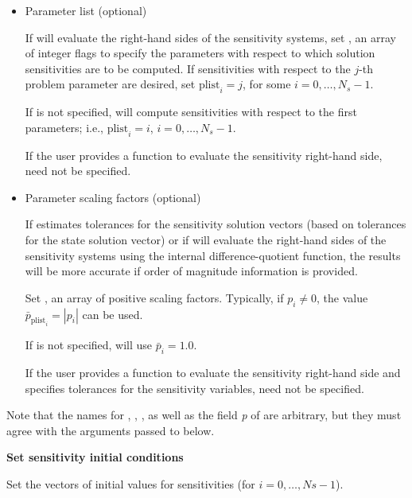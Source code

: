 \begin{Steps}
\begin{itemize}
    \item Parameter list (optional)

      If {\cvodes} will evaluate the right-hand sides of the sensitivity 
      systems, set , an array of  integer flags to specify the 
      parameters  with respect to which solution sensitivities are to be computed.
      If sensitivities with respect to the $j$-th problem parameter are desired, set
      ${\text{plist}}_i = j$, for some $i=0,\ldots,N_s-1$.

      If  is not specified, {\cvodes} will compute sensitivities with respect
      to the first  parameters; i.e., ${\text{plist}}_i = i$, $i=0,\ldots,N_s-1$.

      If the user provides a function to evaluate the sensitivity right-hand side,
       need not be specified.

    \item Parameter scaling factors (optional)

      If {\cvodes} estimates tolerances for the sensitivity solution vectors (based
      on tolerances for the state solution vector) or if {\cvodes} will evaluate 
      the right-hand sides of the sensitivity systems using the internal difference-quotient
      function, the results will be more accurate if order of magnitude information is provided.

      Set , an array of  positive scaling factors. Typically,
      if $p_i \ne 0$, the value ${\bar p}_{\text{plist}_i} = |p_i|$ can be used.

      If  is not specified, {\cvodes} will use ${\bar p}_i = 1.0$.

      If the user provides a function to evaluate the sensitivity right-hand side and specifies
      tolerances for the sensitivity variables,  need not be specified.

    \end{itemize}

    Note that the names for , , , as well as the field
    {\em p} of  are arbitrary, but they must agree with the arguments
    passed to  below.

\item
  {\bf Set sensitivity initial conditions}

  Set the  vectors  of  initial values
  for sensitivities (for $i=0,\ldots,Ns-1$). 


\end{Steps}
